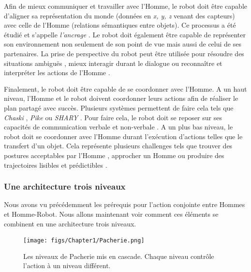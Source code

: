 \documentclass[english,a4paper,11pt,twoside]{StyleThese}
\begin{document}
Afin de mieux communiquer et travailler avec l'Homme, le robot doit être capable d'aligner sa représentation du monde (données en \textit{x, y, z} venant des capteurs) avec celle de l'Homme (relations sémantiques entre objets). Ce processus a été étudié et s’appelle \textit{l'ancrage} \cite{coradeschi2003introduction, mavridis2005grounded, lemaignan2012grounding}. Le robot doit également être capable de représenter son environnement non seulement de son point de vue mais aussi de celui de ses partenaires. La prise de perspective du robot \cite{breazeal2006using,milliez2014framework} peut être utilisée pour résoudre des situations ambiguës \cite{ros2010one}, mieux interagir durant le dialogue \cite{ferreira2015users} ou reconnaître et interpréter les actions de l'Homme \cite{baker2014modeling, nagai2015probabilistic}.

Finalement, le robot doit être capable de se coordonner avec l'Homme. A un haut niveau, l'Homme et le robot doivent coordonner leurs actions afin de réaliser le plan partagé avec succès. Plusieurs systèmes permettent de faire cela tels que \textit{Chaski} \cite{shah2011improved}, \textit{Pike} \cite{karpas2015robust} ou \textit{SHARY} \cite{clodic2009shary}. Pour faire cela, le robot doit se reposer sur ses capacités de communication verbale \cite{roy2000spoken, lucignano2013dialogue, ferreira2015users} et non-verbale \cite{breazeal2005effects, boucher2010facilitative, mutlu2009footing, hart2014gesture}. A un plus bas niveau, le robot doit se coordonner avec l'Homme durant l'exécution d'actions telles que le transfert d'un objet. Cela représente plusieurs challenges tels que trouver des postures acceptables par l'Homme \cite{cakmak2011human, dehais2011physiological, mainprice2012sharing}, approcher un Homme \cite{walters2007robotic} ou produire des trajectoires lisibles et prédictibles \cite{sisbot2012human, kruse2013human}.


\subsubsection{Une architecture trois niveaux}

Nous avons vu précédemment les prérequis pour l'action conjointe entre Hommes et Homme-Robot. Nous allons maintenant voir comment ces éléments se combinent en une architecture trois niveaux.

\begin{figure}[!h]
	\centering
    \texttt{[image: figs/Chapter1/Pacherie.png]}
    \caption{Les niveaux de Pacherie mis en cascade. Chaque niveau contrôle l'action à un niveau différent.}
    \label{fig:Pacherie}
\end{figure} 
\end{document}
